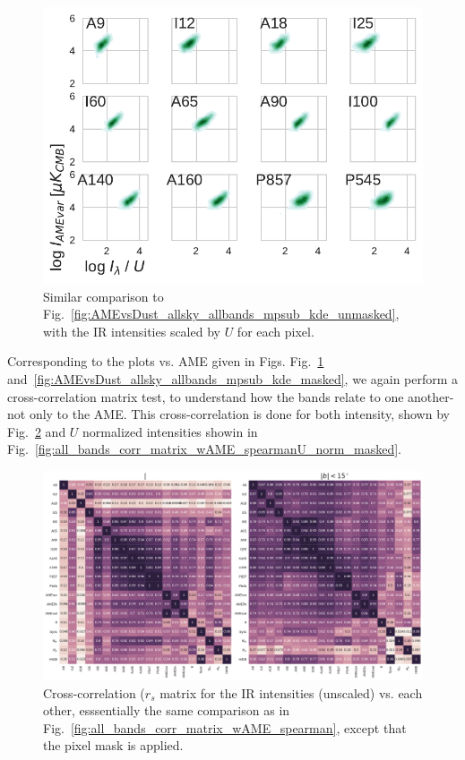               \begin{figure}
                \includegraphics[width=\textwidth]{../Plots/ch_allsky/AMEvsDust_allsky_allbands_mpsub_UNorm_kde_masked.pdf}
                \centering
                \caption{Similar comparison to Fig.~\ref{fig:AMEvsDust_allsky_allbands_mpsub_kde_unmasked}, with the IR intensities scaled by $U$ for each pixel. }
                \label{fig:AMEvsDust_allsky_allbands_mpsub_UNorm_kde_masked}
              \end{figure}
            Corresponding to the plots vs. AME given in Figs. Fig.~\ref{fig:AMEvsDust_allsky_allbands_mpsub_UNorm_kde_masked} and~\ref{fig:AMEvsDust_allsky_allbands_mpsub_kde_masked}, we again perform a cross-correlation matrix test, to understand how the bands relate to one another- not only to the AME. This cross-correlation is done for both intensity, shown by Fig.~\ref{fig:all_bands_corr_matrix_wAME_spearmanintensity_maskall} and $U$ normalized intensities showin in Fig.~\ref{fig:all_bands_corr_matrix_wAME_spearmanU_norm_masked}.
              \begin{figure}
                \includegraphics[width=\textwidth]{../Plots/ch_allsky/all_bands_corr_matrix_wAME_spearmanintensity_maskall.pdf}
                \centering
                \caption{Cross-correlation ($r_{s}$ matrix for the IR intensities (unscaled) vs. each other, esssentially the same comparison as in Fig.~\ref{fig:all_bands_corr_matrix_wAME_spearman}, except that the pixel mask is applied.}
                \label{fig:all_bands_corr_matrix_wAME_spearmanintensity_maskall}
              \end{figure}
